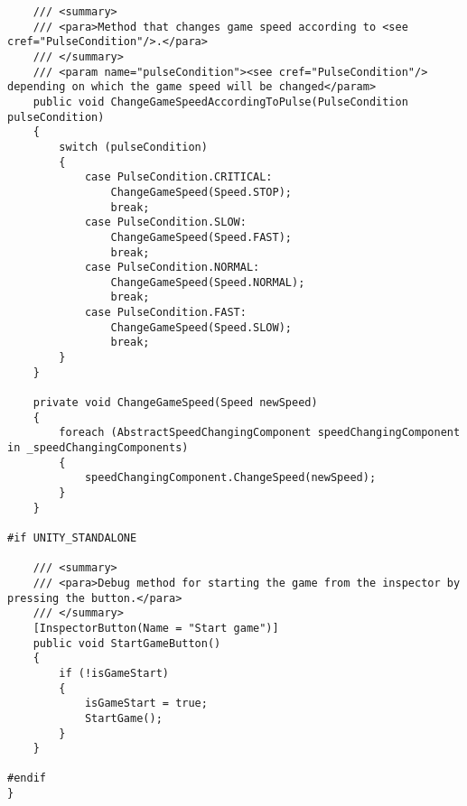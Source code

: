 \begin{verbatim}
    /// <summary>
    /// <para>Method that changes game speed according to <see cref="PulseCondition"/>.</para>
    /// </summary>
    /// <param name="pulseCondition"><see cref="PulseCondition"/> depending on which the game speed will be changed</param>
    public void ChangeGameSpeedAccordingToPulse(PulseCondition pulseCondition)
    {
        switch (pulseCondition)
        {
            case PulseCondition.CRITICAL:
                ChangeGameSpeed(Speed.STOP);
                break;
            case PulseCondition.SLOW:
                ChangeGameSpeed(Speed.FAST);
                break;
            case PulseCondition.NORMAL:
                ChangeGameSpeed(Speed.NORMAL);
                break;
            case PulseCondition.FAST:
                ChangeGameSpeed(Speed.SLOW);
                break;
        }
    }

    private void ChangeGameSpeed(Speed newSpeed)
    {
        foreach (AbstractSpeedChangingComponent speedChangingComponent in _speedChangingComponents)
        {
            speedChangingComponent.ChangeSpeed(newSpeed);
        }
    }

#if UNITY_STANDALONE

    /// <summary>
    /// <para>Debug method for starting the game from the inspector by pressing the button.</para>
    /// </summary>
    [InspectorButton(Name = "Start game")]
    public void StartGameButton()
    {
        if (!isGameStart)
        {
            isGameStart = true;
            StartGame();
        }
    }

#endif
}
\end{verbatim}
